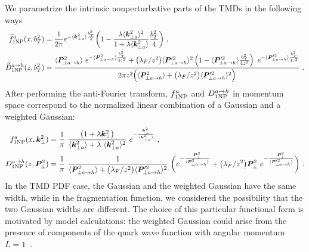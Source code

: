 \documentclass[aps,preprintnumbers,showpacs,nofootinbib,superscriptaddress,floatfix]{revtex4}
\newcommand{\T}{\perp}
\newcommand{\bT}{b_T}
\begin{document}
We parametrize the intrinsic nonperturbative parts of the TMDs in the
following ways
\begin{align}
\widetilde{f}_{1 {\rm NP}}^a (x, \bT^2) &= \frac{1}{2\pi}
        e^{-\langle \bm{k}_{\T a}^2 \rangle \frac{\bT^2}{4}}
        \bigg( 1 - \frac{\lambda \langle \bm{k}_{\T a}^2 \rangle^2}{1+\lambda\langle \bm{k}_{\T a}^2 \rangle}  \frac{\bT^2}{4} \bigg)\  ,
\label{e:f1NP} \\
\widetilde{D}_{1 {\rm NP}}^{a \to h} (z, \bT^2) &= 
    \frac{ \langle \bm{P}_{\T a\to h}^2 \rangle \   e^{-\langle \bm{P}_{\T
          a\to h}^2 \rangle \frac{\bT^2}{4 z^2}}
        + \big(\lambda_F/z^2\big)    \langle \bm{P}_{\T a\to h}'^2 \rangle^2
    \left(1 - \langle \bm{P}_{\T a\to h}'^2 \rangle \frac{\bT^2}{4 z^2} \right)
         \  e^{- \langle \bm{P}_{\T a\to h}'^2 \rangle \frac{\bT^2}{4z^2}}}
     {2 \pi z^2 \Big(\langle \bm{P}_{\T a\to h}^2 \rangle + \big(\lambda_F/z^2\big)   \langle \bm{P}_{\T a\to h}'^2 \rangle^2\Big)} \  .
\label{e:D1NP}
\end{align} 
After performing the anti-Fourier transform, $f_{1 \rm NP}^a$ and $D_{1\rm
  NP}^{a \to h}$ in momentum space correspond to the normalized linear combination of
a Gaussian and a weighted Gaussian:
\begin{align} 
f_{1 {\rm NP}}^a (x, \bm{k}_{\T}^2) &= \frac{1}{\pi} \  
                        \frac{\big( 1 +\lambda \bm{k}_{\T}^2\big)}
                                {\langle \bm{k}_{\T a}^2 \rangle +\lambda \  \langle \bm{k}_{\T a}^2 \rangle^2}
                        \  e^{- \frac{\bm{k}_{\T}^2}{\langle \bm{k}_{\T a}^2 \rangle}} \  ,
\label{e:f1NPk}   \\
D_{1 {\rm NP}}^{a\to h} (z, \bm{P}_{\T}^2) &=  \frac{1}{\pi} \   
                  \frac{1}{\langle \bm{P}_{\T a\to h}^2 \rangle +
                    \big(\lambda_F/z^2\big) \langle \bm{P}_{\T a\to h}'^2 \rangle^2}
           \   \bigg( e^{- \frac{\bm{P}_{\T}^2}{\langle \bm{P}_{\T a\to h}^2 \rangle}}
                            + \big(\lambda_F/z^2\big)   \bm{P}_{\T}^2 \  
           e^{- \frac{\bm{P}_{\T}^2}{\langle \bm{P}_{\T a\to h}'^2 \rangle}} \bigg) \  .
\label{e:D1NPk}
\end{align} 
In the TMD PDF case, the Gaussian and the
weighted Gaussian have the same width, while in the fragmentation function, we
considered the possibility that the two Gaussian widths are different. 
The choice of this particular functional form is motivated by model
calculations: the weighted Gaussian could arise from 
the presence of components of the quark wave function 
with angular momentum
$L=1$~\cite{Bacchetta:2007wc,Pasquini:2008ax,Avakian:2010br,Bacchetta:2010si,Burkardt:2015qoa}.   
\end{document}
